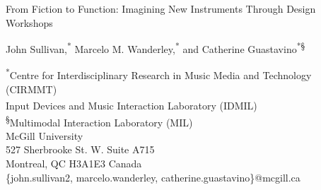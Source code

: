 \documentclass[letterpaper, 12pt]{article}
\begin{document}
{\cmjTitle From Fiction to Function: Imagining New Instruments Through Design Workshops}
\vspace*{24pt}


{\cmjAuthor John Sullivan,\textsuperscript{*\dag} Marcelo M. Wanderley,\textsuperscript{*\dag} and Catherine Guastavino\textsuperscript{*\S}}	%
 
\begin{cmjAuthorAddress}
    \textsuperscript{*}Centre for Interdisciplinary Research in Music Media and Technology (CIRMMT) \\
    \textsuperscript{\dag}Input Devices and Music Interaction Laboratory (IDMIL) \\
    \textsuperscript{\S}Multimodal Interaction Laboratory (MIL) \\
	McGill University\\
	527 Sherbrooke St. W. Suite A715 \\
    Montreal, QC H3A1E3 Canada \\
	\{john.sullivan2, marcelo.wanderley, catherine.guastavino\}@mcgill.ca
\end{cmjAuthorAddress}


\begin{abstract}
This paper introduces a set of workshops held with expert musicians to imagine novel musical instruments through design fiction. The workshops were based on the Magic Machine workshops developed by Kristina Andersen, in which participants crafted non-functional prototypes of instruments they would want to use in their own performance practice. Through in-situ activities and post-workshop thematic analysis, a set of design specifications were developed that can be applied to the design of new digital musical instruments intended for use in real-world artistic practice. In addition to generating tangible elements for design, the theories and methods utilized, based in human-computer interaction and human-centered design, are offered as a possible model for merging imaginative idea generation with functional design outputs. 

\end{abstract}
\end{document}
